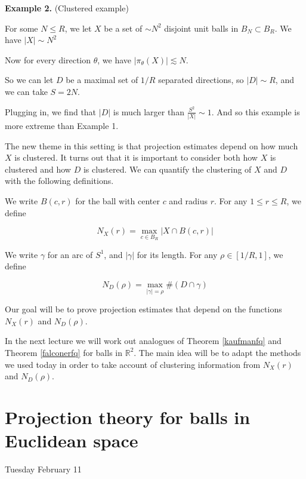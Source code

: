 \documentclass[12pt]{amsart}
\newcommand{\RR}{\mathbb{R}}
\begin{document}
\vskip10pt

{\bf Example 2.} (Clustered example) 

For some $N \le R$, we let $X$ be a set of $\sim N^2$ disjoint unit balls in $B_N \subset B_R$.  We have $|X| \sim N^2$

Now for every direction $\theta$, we have $|\pi_\theta(X)| \lesssim N$.  

So we can let $D$ be a maximal set of $1/R$ separated directions, so $|D| \sim R$, and we can take  $S = 2N$.  

Plugging in, we find that $|D|$ is much larger than $\frac{S^2}{|X|} \sim 1$.  And so this example is more extreme than Example 1.

\vskip10pt

The new theme in this setting is that projection estimates depend on how much $X$ is clustered.  It turns out that it is important to consider both how $X$ is clustered and how $D$ is clustered.  We can quantify the clustering of $X$ and $D$ with the following definitions.

We write $B(c,r)$ for the ball with center $c$ and radius $r$.  For any $1 \le r \le R$, we define

\begin{equation}
N_X(r) = \max_{c \in B_R} | X \cap B(c,r)|
\end{equation}

We write $\gamma$ for an arc of $S^1$, and $|\gamma|$ for its length.  For any $\rho \in [1/R, 1]$, we define

\begin{equation}
N_D(\rho) = \max_{|\gamma| = \rho} \# (D \cap \gamma)
\end{equation}

Our goal will be to prove projection estimates that depend on the functions $N_X(r)$ and $N_D(\rho)$.

In the next lecture we will work out analogues of Theorem \ref{kaufmanfq} and Theorem \ref{falconerfq} for balls in $\RR^2$.  The main idea will be to adapt the methods we used today in order to take account of clustering information from $N_X(r)$ and $N_D(\rho)$.

\newpage

\section{Projection theory for balls in Euclidean space}

Tuesday February 11 
\end{document}
